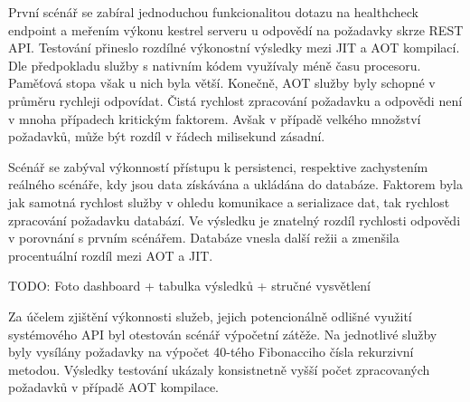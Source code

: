 
První scénář se zabíral jednoduchou funkcionalitou dotazu na healthcheck endpoint a meřením výkonu kestrel serveru u odpovědí na požadavky skrze REST API. Testování přineslo rozdílné výkonostní výsledky mezi JIT a AOT kompilací. Dle předpokladu služby s nativním kódem využívaly méně času procesoru. Paměťová stopa však u nich byla větší. Konečně, AOT služby byly schopné v průměru rychleji odpovídat. Čistá rychlost zpracování požadavku a odpovědi není v mnoha případech kritickým faktorem. Avšak v případě velkého množství požadavků, může být rozdíl v řádech milisekund zásadní.



Scénář se zabýval výkonností přístupu k persistenci, respektive zachystením reálného scénáře, kdy jsou data získávána a ukládána do databáze. Faktorem byla jak samotná rychlost služby v ohledu komunikace a serializace dat, tak rychlost zpracování požadavku databází. Ve výsledku je znatelný rozdíl rychlosti odpovědi v porovnání s prvním scénářem. Databáze vnesla další režii a zmenšila procentuální rozdíl mezi AOT a JIT.

TODO: Foto dashboard + tabulka výsledků + stručné vysvětlení


Za účelem zjištění výkonnosti služeb, jejich potencionálně odlišné využití systémového API byl otestován scénář výpočetní zátěže. Na jednotlivé služby byly vysílány požadavky na výpočet 40-tého Fibonacciho čísla rekurzivní metodou. Výsledky testování ukázaly konsistnetně vyšší počet zpracovaných požadavků v případě AOT kompilace. 

